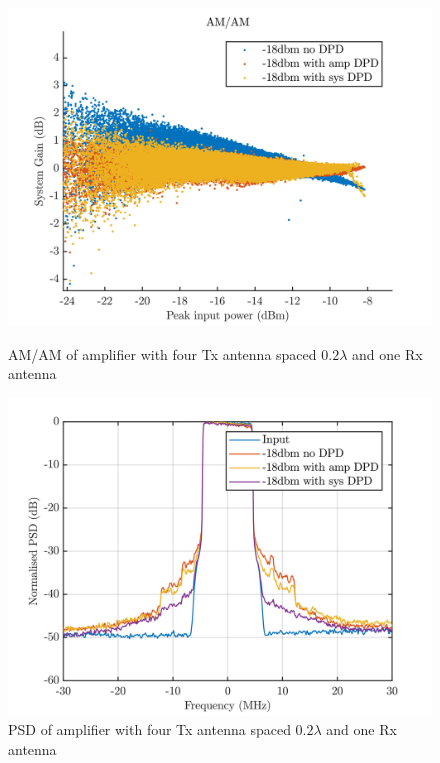 \begin{figure}[H]
  \centering
  \begin{minipage}[b]{0.5\textwidth}
	\includegraphics[scale = 0.5]{figures/measurement/cree/four/amam_four_ant_0p2.png}
	\caption{AM/AM of amplifier with four Tx antenna spaced $0.2\lambda$ and one Rx antenna}
    \label{fig:cree_amam_four_ant1}
  \end{minipage}
  \hfill
  \begin{minipage}[b]{0.4\textwidth}
\includegraphics[scale = 0.5]{figures/measurement/cree/four/psd_four_ant_0p2.png}
\caption{PSD of amplifier with four Tx antenna spaced $0.2\lambda$ and one Rx antenna}
    \label{fig:cree_psd_four_ant1}
  \end{minipage}
\end{figure}

